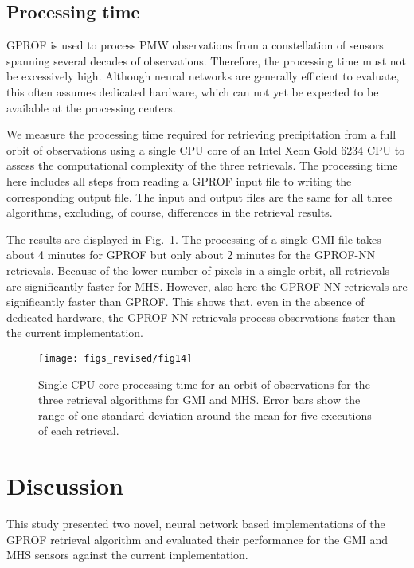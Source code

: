 \documentclass[journal abbreviation, manuscript]{copernicus}
\begin{document}
\subsection{Processing time}

GPROF is used to process PMW observations from a constellation of sensors
spanning several decades of observations. Therefore, the processing time must
not be excessively high. Although neural networks are generally  efficient to
evaluate, this often assumes dedicated hardware, which can not yet be expected
to be available at the processing centers.

We measure the processing time required for retrieving precipitation from a full
orbit of observations using a single CPU core of an Intel Xeon Gold 6234 CPU to
assess the computational complexity of the three retrievals. The processing time
here includes all steps from reading a GPROF input file to writing the
corresponding output file. The input and output files are the same for all three
algorithms, excluding, of course, differences in the retrieval results.

The results are displayed in Fig.~\ref{fig:processing_time}. The processing of a
single GMI file takes about 4 minutes for GPROF but only about 2 minutes for the
GPROF-NN retrievals. Because of the lower number of pixels in a single orbit,
all retrievals are significantly faster for MHS. However, also here the GPROF-NN
retrievals are significantly faster than GPROF. This shows that, even in the
absence of dedicated hardware, the GPROF-NN retrievals process observations
faster than the current implementation.

\begin{figure}[hbpt]
  \centering
  \texttt{[image: figs\_revised/fig14]}
  \caption{Single CPU core processing time for an orbit of observations  for
    the three retrieval algorithms for GMI and MHS. Error bars show the range of
  one standard deviation around the mean for five executions of each retrieval.}
  \label{fig:processing_time}
\end{figure}


\section{Discussion}

This study presented two novel, neural network based implementations of the
GPROF retrieval algorithm and evaluated their performance for the GMI and MHS
sensors against the current implementation.
\end{document}
